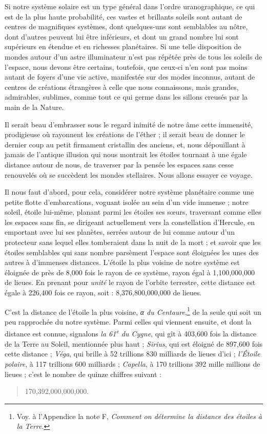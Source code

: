 \documentclass[a4paper, 11pt, oneside]{article}
\begin{document}
Si notre système solaire est un type général dans l'ordre uranographique, ce qui est de la plus haute probabilité, ces vastes et brillants soleils sont autant de centres de magnifiques systèmes, dont quelques-uns sont semblables au nôtre, dont d'autres peuvent lui être inférieurs, et dont un grand nombre lui sont supérieurs en étendue et en richesses planétaires. Si une telle disposition de mondes autour d'un astre illuminateur n'est pas répétée près de tous les soleils de l'espace, nous devons être certains, toutefois, que ceux-ci n'en sont pas moins autant de foyers d'une vie active, manifestée sur des modes inconnus, autant de centres de créations étrangères à celle que nous connaissons, mais grandes, admirables, sublimes, comme tout ce qui germe dans les sillons creusés par la main de la Nature.

Il serait beau d'embrasser sous le regard inimité de notre âme cette immensité, prodigieuse où rayonnent les créations de l'éther ; il serait beau de donner le dernier coup au petit firmament cristallin des anciens, et, nous dépouillant à jamais de l'antique illusion qui nous montrait les étoiles tournant à une égale distance autour de nous, de traverser par la pensée les espaces sans cesse renouvelés où se succèdent les mondes stellaires. Nous allons essayer ce voyage.

Il nous faut d'abord, pour cela, considérer notre système planétaire comme une petite flotte d'embarcations, voguant isolée au sein d'un vide immense ; notre soleil, étoile lui-même, planant parmi les étoiles ses sœurs, traversant comme elles les espaces sans fin, se dirigeant actuellement vers la constellation d'Hercule, en emportant avec lui ses planètes, serrées autour de lui comme autour d'un protecteur sans lequel elles tomberaient dans la nuit de la mort ; et savoir que les étoiles semblables qui sans nombre parsèment l'espace sont éloignées les unes des autres à d'immenses distances. L'étoile la plus voisine de notre système est éloignée de près de 8,000 fois le rayon de ce système, rayon égal à 1,100,000,000 de lieues. En prenant pour \emph{unité} le rayon de l'orbite terrestre, cette distance est égale à 226,400 fois ce rayon, soit : 8,376,800,000,000 de lieues.

C'est la distance de l'étoile la plus voisine, \emph{α du Centaure},\footnote{Voy. à l'Appendice la note F, \emph{Comment on détermine la distance des étoiles à la Terre}.} de la seule qui soit un peu rapprochée du notre système. Parmi celles qui viennent ensuite, et dont la distance est connue, signalons \emph{la 61\textsuperscript{e} du Cygne}, qui gît à 403,600 fois la distance de la Terre au Soleil, mentionnée plus haut ; \emph{Sirius}, qui est éloigné de 897,600 fois cette distance ; \emph{Véga}, qui brille à 52 trillions 830 milliards de lieues d'ici ; \emph{l'Étoile polaire}, à 117 trillions 600 milliards ; \emph{Capella}, à 170 trillions 392 mille millions de lieues ; c'est le nombre de quinze chiffres suivant :
\begin{quotation}
170,392,000,000,000.
\end{quotation}
\end{document}
